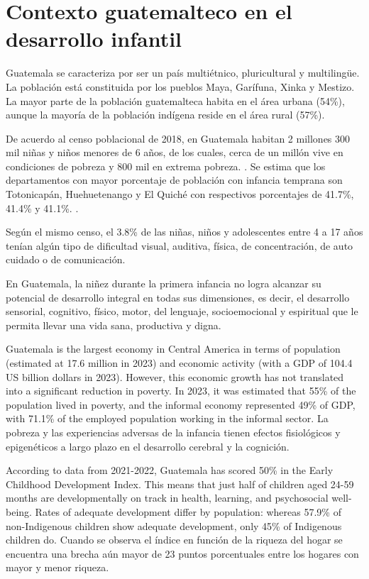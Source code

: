 \section{Contexto guatemalteco en el desarrollo infantil}
Guatemala se caracteriza por ser un país multiétnico, pluricultural y
multilingüe. La población está constituida por los pueblos Maya, Garífuna,
Xinka y Mestizo. La mayor parte de la población guatemalteca habita en el área
urbana (54\%), aunque la mayoría de la población indígena reside en el área
rural (57\%). \cite{PoliticaInfanciaGuate}

De acuerdo al censo poblacional de 2018, en Guatemala habitan 2 millones 300
mil niñas y niños menores de 6 años, de los cuales, cerca de un millón vive en
condiciones de pobreza y 800 mil en extrema pobreza. \cite{INE}. Se estima que
los departamentos con mayor porcentaje de población con infancia temprana son
Totonicapán, Huehuetenango y El Quiché con respectivos porcentajes de 41.7\%,
41.4\% y 41.1\%. \cite{UNICEFAtlas}.

Según el mismo censo, el 3.8\% de las niñas, niños y adolescentes entre 4 a 17
años tenían algún tipo de dificultad visual, auditiva, física, de
concentración, de auto cuidado o de comunicación. \cite{INE}

En Guatemala, la niñez durante la primera infancia no logra alcanzar su
potencial de desarrollo integral en todas sus dimensiones, es decir, el
desarrollo sensorial, cognitivo, físico, motor, del lenguaje, socioemocional y
espiritual que le permita llevar una vida sana, productiva y digna.
\cite{PoliticaInfanciaGuate}

Guatemala is the largest economy in Central America in terms of population
(estimated at 17.6 million in 2023) and economic activity (with a GDP of 104.4
US billion dollars in 2023). However, this economic growth has not translated
into a significant reduction in poverty. In 2023, it was estimated that 55\% of
the population lived in poverty, and the informal economy represented 49\% of
GDP, with 71.1\% of the employed population working in the informal sector.
\cite{WorldBankGuate} La pobreza y las experiencias adversas de la infancia
tienen efectos fisiológicos y epigenéticos a largo plazo en el desarrollo
cerebral y la cognición. \cite{Luby_2015} \cite{Noble_2015}

According to data from 2021-2022, Guatemala has scored 50\% in the Early
Childhood Development Index. This means that just half of children aged 24-59
months are developmentally on track in health, learning, and psychosocial
well-being. Rates of adequate development differ by population: whereas 57.9\%
of non-Indigenous children show adequate development, only 45\% of Indigenous
children do. \cite{SESAN2022} Cuando se observa el índice en función de la
riqueza del hogar se encuentra una brecha aún mayor de 23 puntos porcentuales
entre los hogares con mayor y menor riqueza. \cite{UNICEFGuate}

